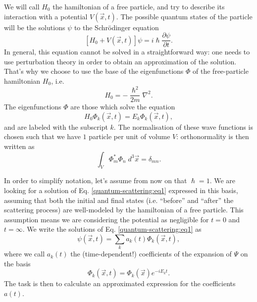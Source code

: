 We will call $H_0$ the hamiltonian of a free particle, and try to describe its interaction with a potential $V(\Vec{x},t)$. The possible quantum states of the particle will be the solutions $\psi$ to the  Schr\"odinger equation
\begin{equation}
\left[ H_{0} + V(\Vec{x},t) \right] \psi = i\hslash\frac{\partial\psi}{\partial t}.
\label{quantum-scattering:eq1}
\end{equation}
In general, this equation cannot be solved in a straightforward way: one needs to use perturbation theory in order to obtain an approximation of the solution. That's why we choose to use the base of the eigenfunctions $\Phi$ of the free-particle hamiltonian $H_0$, i.e.
\begin{equation*}
H_{0} = -\frac{\hslash^2}{2m}\nabla^{2}.
\end{equation*}
The eigenfunctions $\Phi$ are those which solve the equation
\begin{equation*}
H_{0}\Phi_{k}(\Vec{x},t) = E_{k}\Phi_{k}(\Vec{x},t),
\end{equation*}
and are labeled with the subscript $k$.
The normalisation of these wave functions is chosen such that we have $1$ particle per unit of volume $V$: orthonormality is then written as
\begin{equation*}
\int_{V}\Phi_{m}^{*}\Phi_{n}\;d^3\Vec{x} = \delta_{mn}.
\end{equation*}

In order to simplify notation, let's assume from now on that $\hslash=1$.
We are looking for a solution of Eq. \eqref{quantum-scattering:eq1} expressed in this basis, assuming that both the initial and final states (i.e. ``before'' and ``after'' the scattering process) are well-modeled by the hamiltonian of a free particle. This assumption means we are considering the potential as negligible for $t=0$ and $t=\infty$.
We write the solutions of Eq. \eqref{quantum-scattering:eq1} as
\begin{equation*}
\psi(\Vec{x},t) = \sum_{k}a_{k}(t)\Phi_{k}(\Vec{x},t),
\end{equation*}
where we call $a_{k}(t)$ the (time-dependent!) coefficients of the expansion of $\Psi$ on the basis
\begin{equation}
\Phi_{k}(\Vec{x},t) = \Phi_{k}(\Vec{x})e^{-iE_{k}t}.\label{eq:freeparticlesol}
\end{equation}
The task is then to calculate an approximated expression for the coefficients $a(t)$.


